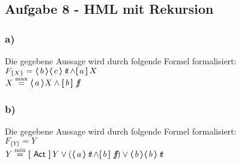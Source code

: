 \subsection*{Aufgabe 8 - HML mit Rekursion}

\subsubsection*{a)}
Die gegebene Aussage wird durch folgende Formel formalisiert: \\
$ F_{ \{X\} } = \poss{b} \poss{c} \true \land \necess{a} X $ \\
$ X \HMmax \poss{a} X \land \necess{b} \false $ \\

\subsubsection*{b)}
Die gegebene Aussage wird durch folgende Formel formalisiert: \\
$  F_{ \{Y\} } = Y $ \\
$ Y \HMmin \necess{\Act} Y \lor (\poss{a} \true \land \necess{b} \false)
 \lor \poss{b} \poss{b} \true $ \\


